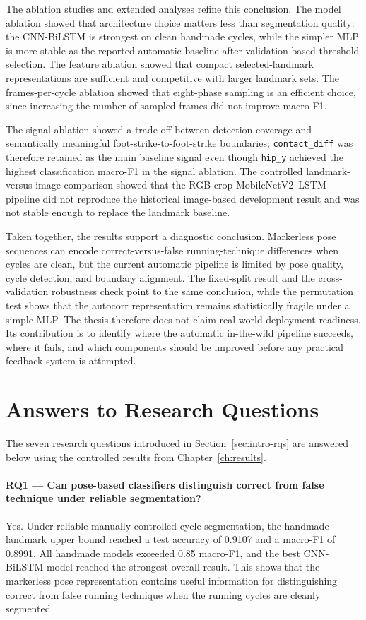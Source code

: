 The ablation studies and extended analyses refine this conclusion. The model
ablation showed that architecture choice matters less than segmentation quality:
the CNN-BiLSTM is strongest on clean handmade cycles, while the simpler MLP is
more stable as the reported automatic baseline after validation-based threshold
selection. The feature ablation showed that compact selected-landmark
representations are sufficient and competitive with larger landmark sets. The
frames-per-cycle ablation showed that eight-phase sampling is an efficient
choice, since increasing the number of sampled frames did not improve macro-F1.

The signal ablation showed a trade-off between detection coverage and
semantically meaningful foot-strike-to-foot-strike boundaries; \texttt{contact\_diff}
was therefore retained as the main baseline signal even though \texttt{hip\_y}
achieved the highest classification macro-F1 in the signal ablation. The
controlled landmark-versus-image comparison showed that the RGB-crop
MobileNetV2--LSTM pipeline did not reproduce the historical image-based
development result and was not stable enough to replace the landmark baseline.

Taken together, the results support a diagnostic conclusion. Markerless pose
sequences can encode correct-versus-false running-technique differences when
cycles are clean, but the current automatic pipeline is limited by pose quality,
cycle detection, and boundary alignment. The fixed-split result and the
cross-validation robustness check point to the same conclusion, while the
permutation test shows that the autocorr representation remains statistically
fragile under a simple MLP. The thesis therefore does not claim
real-world deployment readiness. Its contribution is to identify where the
automatic in-the-wild pipeline succeeds, where it fails, and which components
should be improved before any practical feedback system is attempted.

\section{Answers to Research Questions}
\label{sec:concl-rqs}

The seven research questions introduced in Section~\ref{sec:intro-rqs} are
answered below using the controlled results from Chapter~\ref{ch:results}.

\paragraph{RQ1 --- Can pose-based classifiers distinguish correct from false
technique under reliable segmentation?}
Yes. Under reliable manually controlled cycle segmentation, the handmade
landmark upper bound reached a test accuracy of 0.9107 and a macro-F1 of
0.8991. All handmade models exceeded 0.85 macro-F1, and the best CNN-BiLSTM
model reached the strongest overall result. This shows that the markerless pose
representation contains useful information for distinguishing correct from
false running technique when the running cycles are cleanly segmented.

